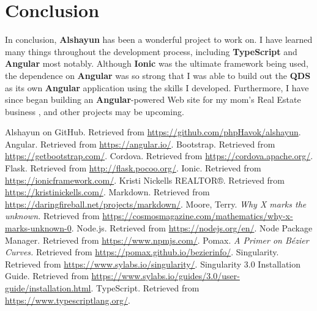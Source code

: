 \documentclass[12pt]{report}
\begin{document}
\chapter{Conclusion}

In conclusion, \textbf{Alshayun} has been a wonderful project to work on. I have
learned many things throughout the development process, including
\textbf{TypeScript} and \textbf{Angular} most notably. Although \textbf{Ionic}
was the ultimate framework being used, the dependence on \textbf{Angular} was so
strong that I was able to build out the \textbf{QDS} as its own \textbf{Angular}
application using the skills I developed. Furthermore, I have since began
building an \textbf{Angular}-powered Web site for my mom's Real Estate business
\cite{knr}, and other projects may be upcoming.

\begin{thebibliography}{9}
     Alshayun on GitHub. Retrieved from
        \url{https://github.com/phpHavok/alshayun}.
     Angular. Retrieved from \url{https://angular.io/}.
     Bootstrap. Retrieved from
        \url{https://getbootstrap.com/}.
     Cordova. Retrieved from \url{https://cordova.apache.org/}.
     Flask. Retrieved from \url{http://flask.pocoo.org/}.
     Ionic. Retrieved from \url{https://ionicframework.com/}.
     Kristi Nickells REALTOR®. Retrieved from
        \url{https://kristinickells.com/}.
     Markdown. Retrieved from
        \url{https://daringfireball.net/projects/markdown/}.
     Moore, Terry. \textit{Why X marks the unknown.} Retrieved
        from \url{https://cosmosmagazine.com/mathematics/why-x-marks-unknown-0}.
     Node\@.js. Retrieved from \url{https://nodejs.org/en/}.
     Node Package Manager. Retrieved from \url{https://www.npmjs.com/}.
     Pomax. \textit{A Primer on Bézier Curves.} Retrieved from
        \url{https://pomax.github.io/bezierinfo/}.
     Singularity. Retrieved from \url{https://www.sylabs.io/singularity/}.
     Singularity 3\@.0 Installation Guide. Retrieved
        from
        \url{https://www.sylabs.io/guides/3.0/user-guide/installation.html}.
     TypeScript. Retrieved from
        \url{https://www.typescriptlang.org/}.
\end{thebibliography}
\end{document}
